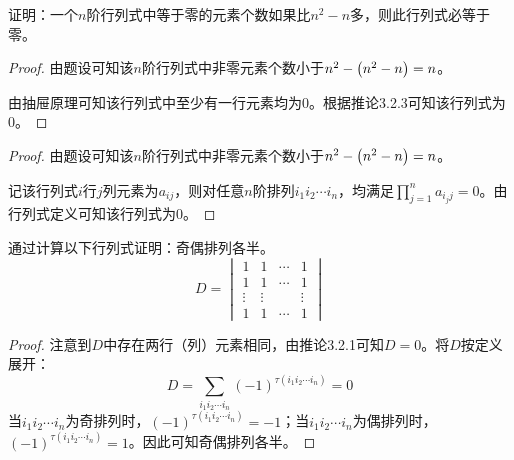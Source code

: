 \begin{problem}
证明：一个\(n\)阶行列式中等于零的元素个数如果比\(n^2-n\)多，则此行列式必等于零。
\end{problem}
\begin{proof}
    由题设可知该\(n\)阶行列式中非零元素个数小于\(n^2-\left( n^2-n \right)=n\)。

    由抽屉原理可知该行列式中至少有一行元素均为\(0\)。根据推论3.2.3可知该行列式为\(0\)。
\end{proof}
\begin{proof}
    由题设可知该\(n\)阶行列式中非零元素个数小于\(n^2-\left( n^2-n \right)=n\)。

    记该行列式\(i\)行\(j\)列元素为\(a_{ij}\)，则对任意\(n\)阶排列\(i_1i_2\cdots i_n\)，均满足\(\prod_{j=1}^{n}a_{i_jj}=0\)。由行列式定义可知该行列式为\(0\)。
\end{proof}

\begin{problem}
通过计算以下行列式证明：奇偶排列各半。
\begin{equation*}
    D=
    \begin{vmatrix}
        1      & 1      & \cdots & 1      \\
        1      & 1      & \cdots & 1      \\
        \vdots & \vdots &        & \vdots \\
        1      & 1      & \cdots & 1
    \end{vmatrix}
\end{equation*}
\end{problem}
\begin{proof}
    注意到\(D\)中存在两行（列）元素相同，由推论3.2.1可知\(D=0\)。将\(D\)按定义展开：
    \begin{equation*}
        D=\sum_{i_1i_2\cdots i_n}(-1)^{\tau(i_1i_2\cdots i_n)}=0
    \end{equation*}
    当\(i_1i_2\cdots i_n\)为奇排列时，\((-1)^{\tau(i_1i_2\cdots i_n)}=-1\)；当\(i_1i_2\cdots i_n\)为偶排列时，\((-1)^{\tau(i_1i_2\cdots i_n)}=1\)。因此可知奇偶排列各半。
\end{proof}

